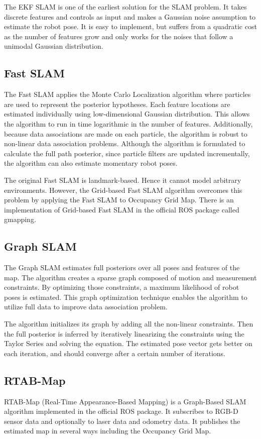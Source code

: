 \documentclass[10pt,journal,compsoc]{IEEEtran}
\begin{document}
The EKF SLAM is one of the earliest solution for the SLAM problem. It takes discrete features and controls as input and makes a Gaussian noise assumption to estimate the robot pose. It is easy to implement, but suffers from a quadratic cost as the number of features grow and only works for the noises that follow a unimodal Gaussian distribution.

\subsection{Fast SLAM}
The Fast SLAM applies the Monte Carlo Localization algorithm where particles are used to represent the posterior hypotheses. Each feature locations are estimated individually using low-dimensional Gaussian distribution. This allows the algorithm to run in time logarithmic in the number of features. Additionally, because data associations are made on each particle, the algorithm is robust to non-linear data association problems. Although the algorithm is formulated to calculate the full path posterior, since particle filters are updated incrementally, the algorithm can also estimate momentary robot poses.

The original Fast SLAM is landmark-based. Hence it cannot model arbitrary environments. However, the Grid-based Fast SLAM algorithm overcomes this problem by applying the Fast SLAM to Occupancy Grid Map. There is an implementation of Grid-based Fast SLAM in the official ROS package called gmapping.

\subsection{Graph SLAM}
The Graph SLAM estimates full posteriors over all poses and features of the map. The algorithm creates a sparse graph composed of motion and measurement constraints. By optimizing those constraints, a maximum likelihood of robot poses is estimated. This graph optimization technique enables the algorithm to utilize full data to improve data association problem.

The algorithm initializes its graph by adding all the non-linear constraints. Then the full posterior is inferred by iteratively linearizing the constraints using the Taylor Series and solving the equation. The estimated pose vector gets better on each iteration, and should converge after a certain number of iterations.

\subsection{RTAB-Map}
RTAB-Map (Real-Time Appearance-Based Mapping) is a Graph-Based SLAM algorithm implemented in the official ROS package. It subscribes to RGB-D sensor data and optionally to laser data and odometry data. It publishes the estimated map in several ways including the Occupancy Grid Map.
\end{document}
